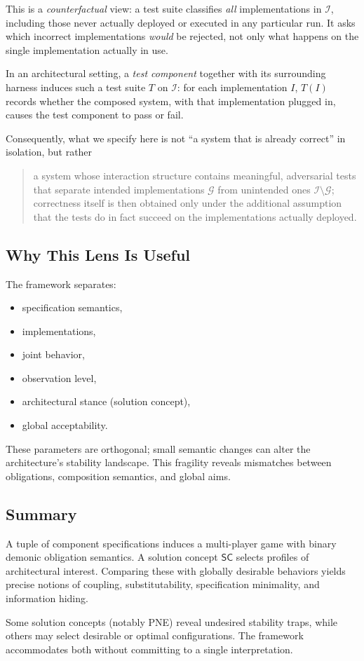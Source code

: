 This is a \emph{counterfactual} view: a test suite classifies \emph{all}
implementations in $\mathcal I$, including those never actually deployed or
executed in any particular run. It asks which incorrect implementations
\emph{would} be rejected, not only what happens on the single implementation
actually in use.

In an architectural setting, a \emph{test component} together with its
surrounding harness induces such a test suite $T$ on $\mathcal I$: for each
implementation $I$, $T(I)$ records whether the composed system, with that
implementation plugged in, causes the test component to pass or fail.

Consequently, what we specify here is not ``a system that is already correct''
in isolation, but rather
\begin{quote}
a system whose interaction structure contains meaningful, adversarial tests
that separate intended implementations $\mathcal G$ from unintended ones
$\mathcal I \setminus \mathcal G$; correctness itself is then obtained only
under the additional assumption that the tests do in fact succeed on the
implementations actually deployed.
\end{quote}

\subsection{Why This Lens Is Useful}

The framework separates:
\begin{itemize}
\item specification semantics,
\item implementations,
\item joint behavior,
\item observation level,
\item architectural stance (solution concept),
\item global acceptability.
\end{itemize}

These parameters are orthogonal; small semantic changes can alter the architecture's stability landscape.
This fragility reveals mismatches between obligations, composition semantics, and global aims.

\subsection{Summary}

A tuple of component specifications induces a multi-player
game with binary demonic obligation semantics.
A solution concept $\mathsf{SC}$ selects profiles of architectural interest.
Comparing these with globally desirable behaviors yields precise notions of coupling, substitutability, specification minimality, and information hiding.

Some solution concepts (notably PNE) reveal undesired stability traps, while others may select desirable or optimal configurations.
The framework accommodates both without committing to a single interpretation.
